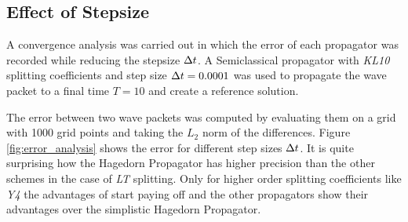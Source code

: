 \subsection{Effect of Stepsize}
\label{subsec:convergence}
%
A convergence analysis was carried out in which the error of each propagator was recorded while reducing the stepsize $\Delta t$.
A Semiclassical propagator with \emph{KL10} splitting coefficients and step size $\Delta t = 0.0001$ was used to propagate the wave packet to a final time $T = 10$ and create a reference solution.
\par\medskip
%
The error between two wave packets was computed by evaluating them on a grid with 1000 grid points and taking the $L_2$ norm of the differences.
Figure \ref{fig:error_analysis} shows the error for different step sizes $\Delta t$.
It is quite surprising how the Hagedorn Propagator has higher precision than the other schemes in the case of \emph{LT} splitting.
Only for higher order splitting coefficients like \emph{Y4} the advantages of  start paying off and the other propagators show their advantages over the simplistic Hagedorn Propagator.
%
